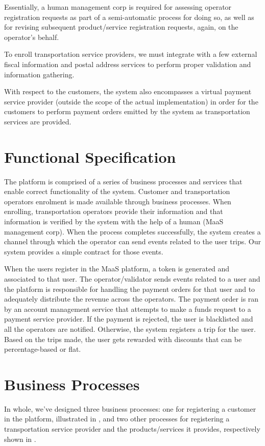 \documentclass[runningheads,a4]{llncs}
\begin{document}
Essentially, a human management corp is required for assessing operator
registration requests as part of a semi-automatic process for doing so, as well
as for revising subsequent product/service registration requests, again, on the
operator's behalf.

To enroll transportation service providers, we must integrate with a few
external fiscal information and postal address services to perform proper
validation and information gathering.

With respect to the customers, the system also encompasses a virtual payment
service provider (outside the scope of the actual implementation) in order for
the customers to perform payment orders emitted by the system as transportation
services are provided.


\section{Functional Specification}
\label{sec:function}
The platform is comprised of a series of business processes and services that
enable correct functionality of the system. Customer and transportation
operators enrolment is made available through business processes. When
enrolling, transportation operators provide their information and that
information is verified by the system with the help of a human (\ac{MaaS}
management corp). When the process completes successfully, the system creates a
channel through which the operator can send events related to the user trips.
Our system provides a simple contract for those events. 

When the users register in the \ac{MaaS} platform, a token is generated and
associated to that user.  The operator/validator sends events related to a user
and the platform is responsible for handling the payment orders for that user
and to adequately distribute the revenue across the operators. The payment order
is ran by an account management service that attempts to make a funds request to
a payment service provider. If the payment is rejected, the user is blacklisted
and all the operators are notified. Otherwise, the system registers a trip for
the user. Based on the trips made, the user gets rewarded with discounts that
can be percentage-based or flat.

\section{Business Processes}
\label{sec:processes}
In whole, we've designed three business processes: one for registering a
customer in the platform, illustrated in , and two other
processes for registering a transportation service provider and the
products/services it provides, respectively shown in
.
\end{document}
